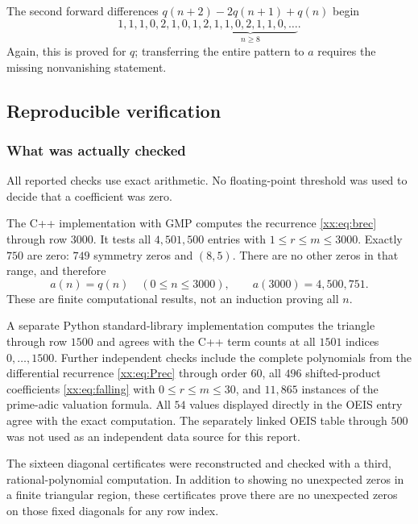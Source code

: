 \documentclass[11pt,a4paper]{article}
\numberwithin{equation}{section}
\theoremstyle{definition}
\theoremstyle{remark}
\theoremstyle{plain}
\begin{document}
The second forward differences $q(n+2)-2q(n+1)+q(n)$ begin
\[
 1,1,1,0,2,1,0,1,\underbrace{2,1,1,0,2,1,1,0,\ldots}_{n\ge8}.
\]
Again, this is proved for $q$; transferring the entire pattern to $a$
requires the missing nonvanishing statement.

\subsection{Reproducible verification}\label{xx:sec:computation}

\subsubsection{What was actually checked}
All reported checks use exact arithmetic. No floating-point threshold was
used to decide that a coefficient was zero.

The C++ implementation with GMP computes the recurrence \eqref{xx:eq:brec}
through row $3000$. It tests all $4{,}501{,}500$ entries with
$1\le r\le m\le3000$. Exactly $750$ are zero: $749$ symmetry zeros and
$(8,5)$. There are no other zeros in that range, and therefore
\begin{equation}\label{xx:eq:3000}
 a(n)=q(n)\quad(0\le n\le3000),\qquad
 a(3000)=4{,}500{,}751.
\end{equation}
These are finite computational results, not an induction proving all $n$.

A separate Python standard-library implementation computes the triangle
through row $1500$ and agrees with the C++ term counts at all $1501$
indices $0,\ldots,1500$. Further independent checks include the complete
polynomials from the differential recurrence \eqref{xx:eq:Prec} through order
$60$, all $496$ shifted-product coefficients \eqref{xx:eq:falling} with
$0\le r\le m\le30$, and $11{,}865$ instances of the prime-adic valuation
formula. All $54$ values displayed directly in the OEIS entry agree with
the exact computation. The separately linked OEIS table through $500$ was
not used as an independent data source for this report.

The sixteen diagonal certificates were reconstructed and checked with a
third, rational-polynomial computation. In addition to showing no unexpected
zeros in a finite triangular region, these certificates prove there are no
unexpected zeros on those fixed diagonals for any row index.
\end{document}
